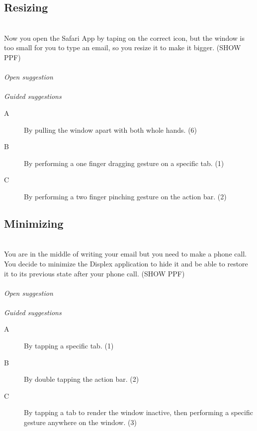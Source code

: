 \subsection{Resizing}
\hfill\\
Now you open the Safari App by taping on the correct icon, but the window is too small for you to type an email, so you resize it to make it bigger.
(SHOW PPF)
\\\\
\emph{Open suggestion}
\\\\
\emph{Guided suggestions}
\begin{description}
\item[A]{By pulling the window apart with both whole hands. (6)}
\item[B]{By performing a one finger dragging gesture on a specific tab. (1)}
\item[C]{By performing a two finger pinching gesture on the action bar. (2)}
\end{description}



\subsection{Minimizing}
\hfill\\
You are in the middle of writing your email but you need to make a phone call. You decide to minimize the Displex application to hide it and be able to restore it to its previous state after your phone call.
(SHOW PPF)
\\\\
\emph{Open suggestion}
\\\\
\emph{Guided suggestions}
\begin{description}
\item[A]{By tapping a specific tab. (1)}
\item[B]{By double tapping the action bar. (2)}
\item[C]{By tapping a tab to render the window inactive, then performing a specific gesture anywhere on the window. (3)}
\end{description}



